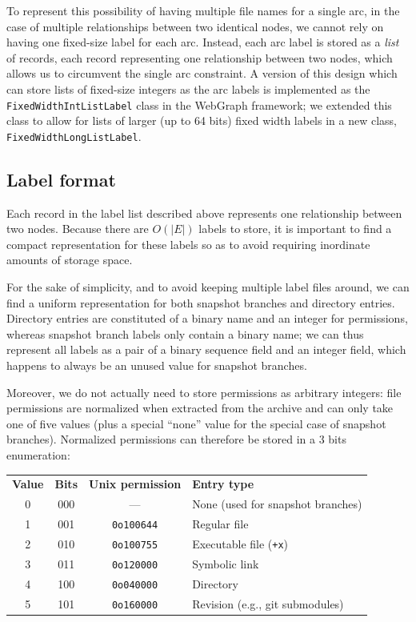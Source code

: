 
To represent this possibility of having multiple file names for a single arc,
in the case of multiple relationships between two identical nodes, we cannot
rely on having one fixed-size label for each arc. Instead, each arc label is
stored as a \emph{list} of records, each record representing one relationship
between two nodes, which allows us to circumvent the single arc constraint.
A version of this design which can store lists of fixed-size integers as the
arc labels is implemented as the \texttt{FixedWidthIntListLabel} class in the
WebGraph framework; we extended this class to allow for lists of larger (up to
64 bits) fixed width labels in a new class, \texttt{FixedWidthLongListLabel}.

\subsection{Label format}%
\label{sec:label-format}

Each record in the label list described above represents one relationship
between two nodes. Because there are $O(|E|)$ labels to store, it is important
to find a compact representation for these labels so as to avoid requiring
inordinate amounts of storage space.

For the sake of simplicity, and to avoid keeping multiple label files around,
we can find a uniform representation for both snapshot branches and directory
entries. Directory entries are constituted of a binary name and an integer for
permissions, whereas snapshot branch labels only contain a binary name; we can
thus represent all labels as a pair of a binary sequence field and an integer
field, which happens to always be an unused value for snapshot branches.

Moreover, we do not actually need to store permissions as arbitrary integers:
file permissions are normalized when extracted from the archive and can only
take one of five values (plus a special ``none'' value for the special case of
snapshot branches).  Normalized permissions can therefore be stored in a 3 bits
enumeration:

\begin{table}[H]
    \centering
\begin{tabular}{c c c l}
    \textbf{Value} & \textbf{Bits} & \textbf{Unix permission} & \textbf{Entry type} \\
    0 & 000 & --- & None (used for snapshot branches) \\
    1 & 001 & \texttt{0o100644} & Regular file \\
    2 & 010 & \texttt{0o100755} & Executable file (\texttt{+x}) \\
    3 & 011 & \texttt{0o120000} & Symbolic link \\
    4 & 100 & \texttt{0o040000} & Directory \\
    5 & 101 & \texttt{0o160000} & Revision (e.g., git submodules)
\end{tabular}
\end{table}

